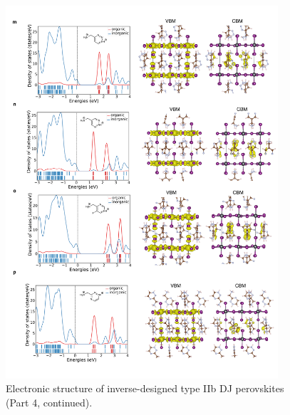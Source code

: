 \begin{figure}[htbp]
    \ContinuedFloat
    \centering
    \includegraphics[width=0.9\textwidth]{figures/synthesis-feasibility/figure5-25-4.png}
    \caption{Electronic structure of inverse-designed type IIb DJ perovskites (Part 4, continued).}
\end{figure}


